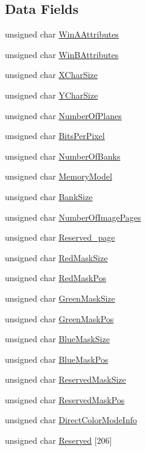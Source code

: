 \subsection*{Data Fields}
\begin{DoxyCompactItemize}
\item 
unsigned char \hyperlink{structMODE__INFO_a13c07e34a389abb77442dc491768dac1}{Win\+A\+Attributes}
\item 
unsigned char \hyperlink{structMODE__INFO_aecd320d96b1d3c1a7d8f09bf53e58412}{Win\+B\+Attributes}
\item 
unsigned char \hyperlink{structMODE__INFO_ace02de2544b40e5c83f7e9fbebd418cc}{X\+Char\+Size}
\item 
unsigned char \hyperlink{structMODE__INFO_a818ddf6ff3ca5e5b45f76478f5813ac2}{Y\+Char\+Size}
\item 
unsigned char \hyperlink{structMODE__INFO_af2cab2389902deca91d2410ee8fbd067}{Number\+Of\+Planes}
\item 
unsigned char \hyperlink{structMODE__INFO_a880652ae9c52f6a83e1fbf38f2799de9}{Bits\+Per\+Pixel}
\item 
unsigned char \hyperlink{structMODE__INFO_af47ccee3ea2d7b618128f3ea97880f86}{Number\+Of\+Banks}
\item 
unsigned char \hyperlink{structMODE__INFO_a8a72ec6a9d9dcf889d05447372f6b8ed}{Memory\+Model}
\item 
unsigned char \hyperlink{structMODE__INFO_a14d876ec0e1f5bcaa21e69086c200b50}{Bank\+Size}
\item 
unsigned char \hyperlink{structMODE__INFO_a5c82ed2c8587e816e139e64fc82e3a97}{Number\+Of\+Image\+Pages}
\item 
unsigned char \hyperlink{structMODE__INFO_ae271e35fb165aea98b15a79ea692c237}{Reserved\+\_\+page}
\item 
unsigned char \hyperlink{structMODE__INFO_a913ed780543a2466489f9d2b54761c5d}{Red\+Mask\+Size}
\item 
unsigned char \hyperlink{structMODE__INFO_a69b9f065c3877b921e1e28ae74d51029}{Red\+Mask\+Pos}
\item 
unsigned char \hyperlink{structMODE__INFO_a4727bb6ac8a21b55a26cd70afdf07b93}{Green\+Mask\+Size}
\item 
unsigned char \hyperlink{structMODE__INFO_a812caaff15468cef3ea4207ceb2c16c4}{Green\+Mask\+Pos}
\item 
unsigned char \hyperlink{structMODE__INFO_a3f3aae9079285d788424ddf9c0ab4da9}{Blue\+Mask\+Size}
\item 
unsigned char \hyperlink{structMODE__INFO_ae2adf5427d1c133490ef54268d409bde}{Blue\+Mask\+Pos}
\item 
unsigned char \hyperlink{structMODE__INFO_a476c52eecf02936bc170809f375bde05}{Reserved\+Mask\+Size}
\item 
unsigned char \hyperlink{structMODE__INFO_adaa96a124ba7fecf2c5930779e289183}{Reserved\+Mask\+Pos}
\item 
unsigned char \hyperlink{structMODE__INFO_a2ed2e0b7027fd0394545e4967e59d9bf}{Direct\+Color\+Mode\+Info}
\item 
unsigned char \hyperlink{structMODE__INFO_afed368ddd295ce1d5f6ee6c7f0e745a5}{Reserved} \mbox{[}206\mbox{]}
\end{DoxyCompactItemize}


